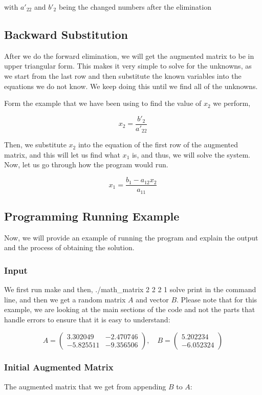 \documentclass[a4paper]{article}
\begin{document}
with $a'_{22}$ and $b'_{2}$ being the changed numbers after the elimination 

\subsection{Backward Substitution}
After we do the forward elimination, we will get the augmented matrix to be in upper triangular form. This makes it very simple to solve for the unknowns, as we start from the last row and then substitute the known variables into the equations we do not know. We keep doing this until we find all of the unknowns. 


Form the example that we have been using to find the value of $x_2$ we perform, 

\[
x_2 = \frac{b'_{2}}{a'_{22}}
\]

Then, we substitute $x_2$ into the equation of the first row of the augmented matrix, and this will let us find what $x_1$ is, and thus, we will solve the system. Now, let us go through how the program would run. 

\[
x_1 = \frac{b_{1} - a_{12}x_2}{a_{11}}
\]

\subsection{Programming Running Example}
Now, we will provide an example of running the program and explain the output and the process of obtaining the solution. 

\subsubsection{Input}
We first run make and then, ./math\_matrix 2 2 2 1 solve print in the command line, and then we get a random matrix \(A\) and vector \(B\). Please note that for this example, we are looking at the main sections of the code and not the parts that handle errors to ensure that it is easy to understand:

\[
A = \begin{pmatrix}
3.302049 & -2.470746 \\
-5.825511 & -9.356506
\end{pmatrix}, \quad B = \begin{pmatrix}
5.202234 \\
-6.052324
\end{pmatrix}
\]

\subsubsection{Initial Augmented Matrix}
The augmented matrix that we get from appending \(B\) to \(A\):
\end{document}
